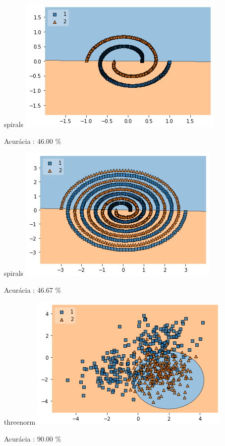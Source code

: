 \documentclass[darkblue]{beamer}
\begin{document}
    \begin{frame}{spirals}
        \includegraphics[width=\textwidth]{output_67_0.png}
        \centerline{Acurácia  : 46.00 \%}
    \end{frame}
    
    \begin{frame}{spirals}
        \includegraphics[width=\textwidth]{output_71_0.png}
        \centerline{Acurácia  : 46.67 \%}
    \end{frame}
    
    \begin{frame}{threenorm}
        \includegraphics[width=\textwidth]{output_75_0.png}
        \centerline{Acurácia  : 90.00 \%}
    \end{frame}
    
\end{document}
